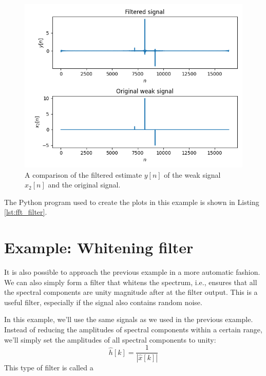 \begin{figure}
  \begin{center}
    \includegraphics[width=\textwidth]{code/024_fft_filter/filter_filtered.png}
  \end{center}
  \caption{A comparison of the filtered estimate $y[n]$ of the weak signal
  $x_2[n]$ and the original signal.}\label{fig:filtered_weak_signal}
\end{figure}

The Python program used to create the plots in this example is shown
in Listing \ref{lst:fft_filter}.




\section{Example: Whitening filter}

It is also possible to approach the previous example in a more
automatic fashion. We can also simply form a filter that whitens the
spectrum, i.e., ensures that all the spectral components are unity
magnitude after at the filter output. This is a useful filter,
especially if the signal also contains random noise.

In this example, we'll use the same signals as we used in the previous
example. Instead of reducing the amplitudes of spectral components
within a certain range, we'll simply set the amplitudes of all
spectral components to unity:
\begin{equation}
  \hat{h}[k] = \frac{1}{|\hat{x}[k]|}
\end{equation}
This type of filter is called a 

